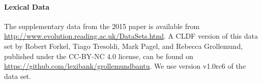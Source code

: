 \documentclass[]{rsos}%
\begin{document}
\paragraph{Lexical Data}
The supplementary data from the 2015 paper \parencite{grollemund2015bantu} is available from
\url{http://www.evolution.reading.ac.uk/DataSets.html}. A CLDF version of this data set by Robert Forkel, Tiago Tresoldi, Mark Pagel, and Rebecca Grollemund, published under the CC-BY-NC 4.0 license, can be found on \url{https://github.com/lexibank/grollemundbantu}. We use version v1.0rc6 of the data set.
\end{document}
